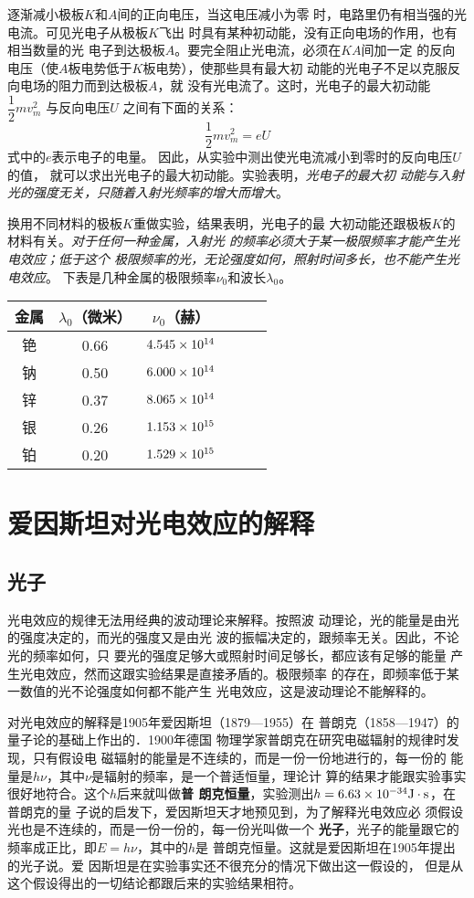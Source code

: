 逐渐减小极板$K$和$A$间的正向电压，当这电压减小为零
时，电路里仍有相当强的光电流。可见光电子从极板$K$飞出
时具有某种初动能，没有正向电场的作用，也有相当数量的光
电子到达极板$A$。要完全阻止光电流，必须在$KA$间加一定
的反向电压（使$A$板电势低于$K$板电势），使那些具有最大初
动能的光电子不足以克服反向电场的阻力而到达极板$A$，就
没有光电流了。这时，光电子的最大初动能
$\dfrac{1}{2}mv^2_m$
与反向电压$U$
之间有下面的关系：
\[\dfrac{1}{2}mv^2_m=eU \]
式中的$e$表示电子的电量。
因此，从实验中测出使光电流减小到零时的反向电压$U$的值，
就可以求出光电子的最大初动能。实验表明，\textit{光电子的最大初
动能与入射光的强度无关，只随着入射光频率的增大而增大}。

换用不同材料的极板$K$重做实验，结果表明，光电子的最
大初动能还跟极板$K$的材料有关。\textit{对于任何一种金属，入射光
的频率必须大于某一极限频率才能产生光电效应；低于这个
极限频率的光，无论强度如何，照射时间多长，也不能产生光
电效应}。
下表是几种金属的极限频率$\nu_0$和波长$\lambda_0$。
\begin{center}
    \begin{tabular}{cccccc}
        \hline
        金属& $\lambda_0$（微米）& $\nu_0$（赫）\\
        \hline
        铯&0.66&$4.545\times 10^{14}$ \\
        钠&0.50&$6.000\times 10^{14}$\\
        锌&0.37&$8.065\times 10^{14}$\\
        银&0.26&$1.153\times 10^{15}$\\
        铂& 0.20&$1.529\times 10^{15}$\\
        \hline
    \end{tabular}
\end{center}



\section{爱因斯坦对光电效应的解释}
\subsection{光子}
光电效应的规律无法用经典的波动理论来解释。按照波
动理论，光的能量是由光的强度决定的，而光的强度又是由光
波的振幅决定的，跟频率无关。因此，不论光的频率如何，只
要光的强度足够大或照射时间足够长，都应该有足够的能量
产生光电效应，然而这跟实验结果是直接矛盾的。极限频率
的存在，即频率低于某一数值的光不论强度如何都不能产生
光电效应，这是波动理论不能解释的。

对光电效应的解释是1905年爱因斯坦（1879—1955）在
普朗克（1858—1947）的量子论的基础上作出的．1900年德国
物理学家普朗克在研究电磁辐射的规律时发现，只有假设电
磁辐射的能量是不连续的，而是一份一份地进行的，每一份的
能量是$h\nu$，其中$\nu$是辐射的频率，是一个普适恒量，理论计
算的结果才能跟实验事实很好地符合。这个$h$后来就叫做\textbf{普
朗克恒量}，实验测出$h=6.63\times10^{-34}{\rm J}\cdot {\rm s}$，在普朗克的量
子说的启发下，爱因斯坦天才地预见到，为了解释光电效应必
须假设光也是不连续的，而是一份一份的，每一份光叫做一个
\textbf{光子}，光子的能量跟它的频率成正比，即$E=h\nu$，其中的$h$是
普朗克恒量。这就是爱因斯坦在1905年提出的光子说。爱
因斯坦是在实验事实还不很充分的情况下做出这一假设的，
但是从这个假设得出的一切结论都跟后来的实验结果相符。

